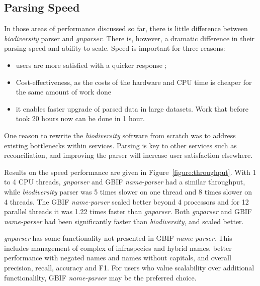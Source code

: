 \documentclass{bmcart}
\begin{document}
\subsection*{Parsing Speed}

In those areas of performance discussed so far, there is little difference
between \textit{biodiversity} parser and \textit{gnparser}. There is, however,
a dramatic difference in their parsing speed and ability to scale. Speed is important for three reasons:


\begin{itemize}

  \item users are more satisfied with a quicker response ;

  \item Cost-effectiveness, as the costs of the hardware and CPU time is cheaper for the same amount of work done

  \item it enables faster upgrade of parsed data in large datasets. Work that before took 20 hours now can be done in 1 hour.
\end{itemize}

One reason to rewrite the \textit{biodiversity} software from scratch was to
address existing bottlenecks within services. Parsing is key to other services
such as reconciliation, and improving the parser will increase user
satisfaction elsewhere.

Results on the speed performance are given in Figure~\ref{figure:throughput}.
With 1 to 4 CPU threads, \textit{gnparser} and GBIF \textit{name-parser} had a
similar throughput, while \textit{biodiversity} parser was 5 times slower on
one thread and  8 times slower on 4 threads. The GBIF \textit{name-parser}
scaled better beyond 4 processors and for 12 parallel threads it was 1.22 times
faster than \textit{gnparser}.  Both \textit{gnparser} and GBIF
\textit{name-parser} had been significantly faster than \textit{biodiversity},
and scaled better.

 \textit{gnparser} has some functionality not presented in
GBIF \textit{name-parser}. This includes management of complex of infraspecies and hybrid names, better performance with negated names and names without capitals, and overall precision, recall, accuracy and F1.  For users who value scalability over
additional functionalilty, GBIF \textit{name-parser} may be the preferred choice.
\end{document}
